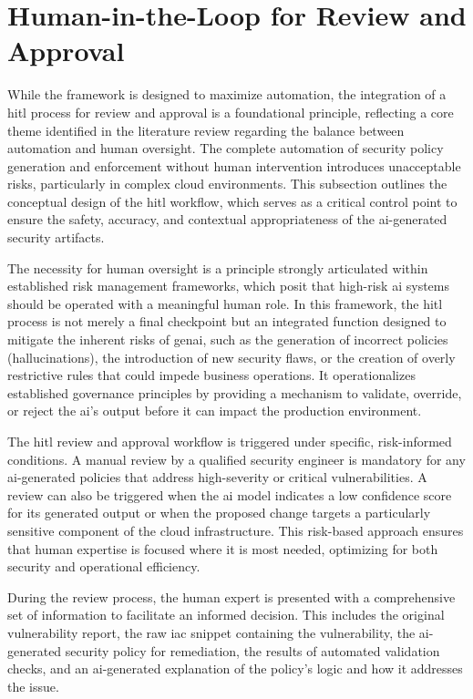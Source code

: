 
\section{Human-in-the-Loop for Review and Approval} %
\label{sub:Human-in-the-Loop for Review and Approval}

While the framework is designed to maximize automation, the integration of a \gls{hitl} process for review and approval is a foundational principle, reflecting a core theme identified in the literature review regarding the balance between automation and human oversight. The complete automation of security policy generation and enforcement without human intervention introduces unacceptable risks, particularly in complex cloud environments. This subsection outlines the conceptual design of the \gls{hitl} workflow, which serves as a critical control point to ensure the safety, accuracy, and contextual appropriateness of the \gls{ai}-generated security artifacts.

The necessity for human oversight is a principle strongly articulated within established risk management frameworks, which posit that high-risk \gls{ai} systems should be operated with a meaningful human role. In this framework, the \gls{hitl} process is not merely a final checkpoint but an integrated function designed to mitigate the inherent risks of \gls{genai}, such as the generation of incorrect policies (hallucinations), the introduction of new security flaws, or the creation of overly restrictive rules that could impede business operations. It operationalizes established governance principles by providing a mechanism to validate, override, or reject the \gls{ai}'s output before it can impact the production environment\cite{barrett_actionable_2023}.

The \gls{hitl} review and approval workflow is triggered under specific, risk-informed conditions. A manual review by a qualified security engineer is mandatory for any \gls{ai}-generated policies that address high-severity or critical vulnerabilities. A review can also be triggered when the \gls{ai} model indicates a low confidence score for its generated output or when the proposed change targets a particularly sensitive component of the cloud infrastructure. This risk-based approach ensures that human expertise is focused where it is most needed, optimizing for both security and operational efficiency.

During the review process, the human expert is presented with a comprehensive set of information to facilitate an informed decision. This includes the original vulnerability report, the raw \gls{iac} snippet containing the vulnerability, the \gls{ai}-generated security policy for remediation, the results of automated validation checks, and an \gls{ai}-generated explanation of the policy’s logic and how it addresses the issue.

